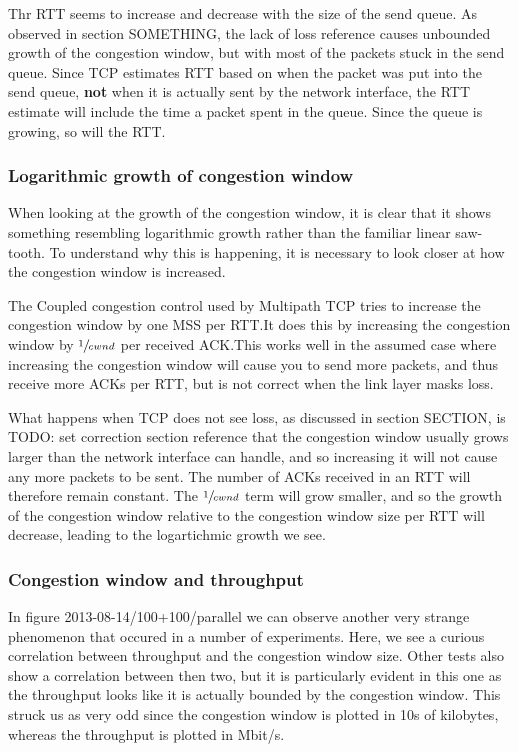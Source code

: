 Thr RTT seems to increase and decrease with the size of the send queue. As
observed in section SOMETHING, the lack of loss reference causes unbounded
growth of the congestion window, but with most of the packets stuck in the send
queue. Since TCP estimates RTT based on when the packet was put into the send
queue, \textbf{not} when it is actually sent by the network interface, the RTT
estimate will include the time a packet spent in the queue. Since the queue is
growing, so will the RTT.

\subsubsection{Logarithmic growth of congestion window}
When looking at the growth of the congestion window, it is clear that it shows
something resembling logarithmic growth rather than the familiar linear
saw-tooth. To understand why this is happening, it is necessary to look closer
at how the congestion window is increased.

The Coupled congestion control used by Multipath TCP tries to increase the
congestion window by one MSS per RTT.\@ It does this by increasing the
congestion window by $\sfrac{1}{cwnd}$ per received ACK.\@ This works well in
the assumed case where increasing the congestion window will cause you to send
more packets, and thus receive more ACKs per RTT, but is not correct when the
link layer masks loss.

What happens when TCP does not see loss, as discussed in section SECTION, is   %
TODO: set correction section reference that the congestion window usually grows
larger than the network interface can handle, and so increasing it will not
cause any more packets to be sent. The number of ACKs received in an RTT will
therefore remain constant. The $\sfrac{1}{cwnd}$ term will grow smaller, and so
the growth of the congestion window relative to the congestion window size per
RTT will decrease, leading to the logartichmic growth we see.

\subsubsection{Congestion window and throughput}
In figure 2013-08-14/100+100/parallel we can observe another very strange      %
phenomenon that occured in a number of experiments. Here, we see a curious
correlation between throughput and the congestion window size. Other tests also
show a correlation between then two, but it is particularly evident in this one
as the throughput looks like it is actually bounded by the congestion window.
This struck us as very odd since the congestion window is plotted in 10s of
kilobytes, whereas the throughput is plotted in Mbit/s.

